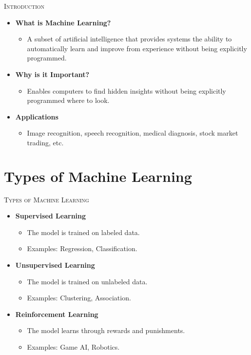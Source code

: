 \documentclass[compress]{beamer}
\begin{document}
\begin{frame}{\textsc{Introduction}}
  \begin{itemize}
    \item \textbf{What is Machine Learning?}
    \begin{itemize}
      \item A subset of artificial intelligence that provides systems the ability to automatically learn and improve from experience without being explicitly programmed.
    \end{itemize}
    \item \textbf{Why is it Important?}
    \begin{itemize}
      \item Enables computers to find hidden insights without being explicitly programmed where to look.
    \end{itemize}
    \item \textbf{Applications}
    \begin{itemize}
      \item Image recognition, speech recognition, medical diagnosis, stock market trading, etc.
    \end{itemize}
  \end{itemize}
\end{frame}

\section[Types]{Types of Machine Learning}

\begin{frame}{\textsc{Types of Machine Learning}}
  \begin{itemize}
    \item \textbf{Supervised Learning}
    \begin{itemize}
      \item The model is trained on labeled data.
      \item Examples: Regression, Classification.
    \end{itemize}
    \item \textbf{Unsupervised Learning}
    \begin{itemize}
      \item The model is trained on unlabeled data.
      \item Examples: Clustering, Association.
    \end{itemize}
    \item \textbf{Reinforcement Learning}
    \begin{itemize}
      \item The model learns through rewards and punishments.
      \item Examples: Game AI, Robotics.
    \end{itemize}
  \end{itemize}
\end{frame}
\end{document}

